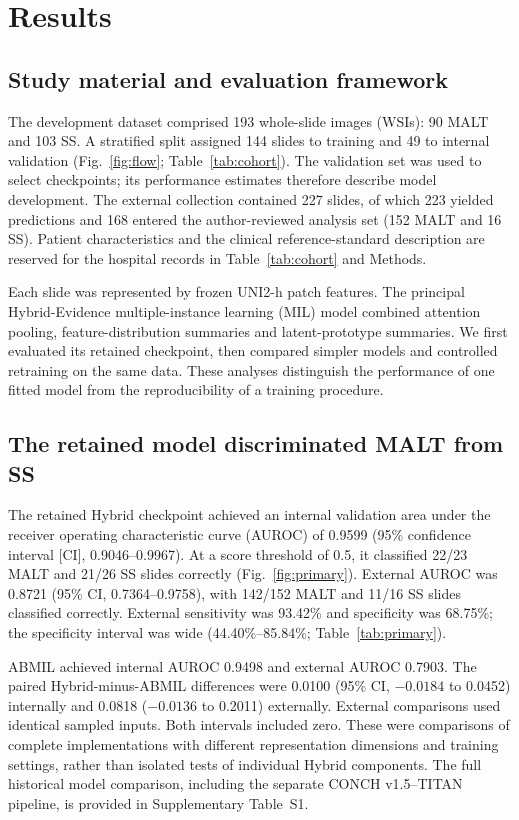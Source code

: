 \section{Results}
\subsection{Study material and evaluation framework}
The development dataset comprised 193 whole-slide images (WSIs): 90 MALT and 103 SS. A stratified split assigned 144 slides to training and 49 to internal validation (Fig.~\ref{fig:flow}; Table~\ref{tab:cohort}). The validation set was used to select checkpoints; its performance estimates therefore describe model development. The external collection contained 227 slides, of which 223 yielded predictions and 168 entered the author-reviewed analysis set (152 MALT and 16 SS). Patient characteristics and the clinical reference-standard description are reserved for the hospital records in Table~\ref{tab:cohort} and Methods.

Each slide was represented by frozen UNI2-h patch features. The principal Hybrid-Evidence multiple-instance learning (MIL) model combined attention pooling, feature-distribution summaries and latent-prototype summaries. We first evaluated its retained checkpoint, then compared simpler models and controlled retraining on the same data. These analyses distinguish the performance of one fitted model from the reproducibility of a training procedure.



\subsection{The retained model discriminated MALT from SS}
The retained Hybrid checkpoint achieved an internal validation area under the receiver operating characteristic curve (AUROC) of 0.9599 (95\% confidence interval [CI], 0.9046--0.9967). At a score threshold of 0.5, it classified 22/23 MALT and 21/26 SS slides correctly (Fig.~\ref{fig:primary}). External AUROC was 0.8721 (95\% CI, 0.7364--0.9758), with 142/152 MALT and 11/16 SS slides classified correctly. External sensitivity was 93.42\% and specificity was 68.75\%; the specificity interval was wide (44.40\%--85.84\%; Table~\ref{tab:primary}).

ABMIL achieved internal AUROC 0.9498 and external AUROC 0.7903. The paired Hybrid-minus-ABMIL differences were 0.0100 (95\% CI, $-0.0184$ to 0.0452) internally and 0.0818 ($-0.0136$ to 0.2011) externally. External comparisons used identical sampled inputs. Both intervals included zero. These were comparisons of complete implementations with different representation dimensions and training settings, rather than isolated tests of individual Hybrid components. The full historical model comparison, including the separate CONCH v1.5--TITAN pipeline, is provided in Supplementary Table~S1.



